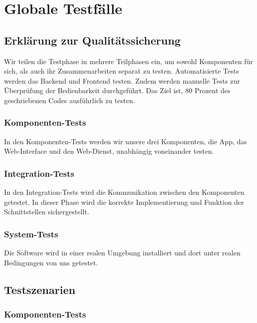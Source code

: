 \chapter{Globale Testf\"alle}
\section{Erkl\"arung zur Qualit\"atssicherung}
Wir teilen die Testphase in mehrere Teilphasen ein, um sowohl Komponenten für sich, als auch ihr Zusammenarbeiten separat zu testen. Automatisierte Tests werden das Backend und Frontend testen. Zudem werden manuelle Tests zur \"Uberpr\"ufung der Bedienbarkeit durchgef\"uhrt.  Das Ziel ist, 80 Prozent des geschriebenen Codes ausf\"uhrlich zu testen.

\subsection{Komponenten-Tests}
In den Komponenten-Tests werden wir unsere drei Komponenten, die \gls{App}, das \gls{Web-Interface} und den \gls{Web-Dienst}, unabhängig voneinander testen.

\subsection{Integration-Tests}
In den Integration-Tests wird die Kommunikation zwischen den Komponenten getestet. In dieser Phase wird die korrekte Implementierung und Funktion der Schnittstellen sichergestellt.

\subsection{System-Tests}
Die Software wird in einer realen Umgebung installiert und dort unter realen Bedingungen von uns getestet.

\section{Testszenarien}
\subsection{Komponenten-Tests}

